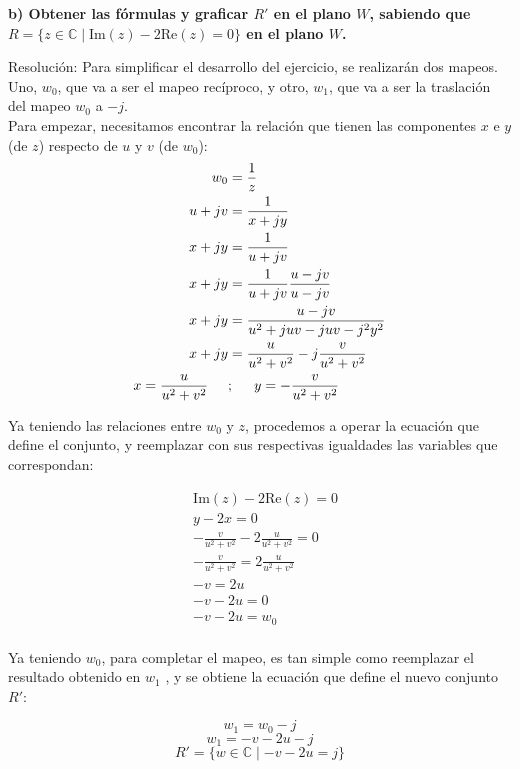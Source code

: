 \documentclass[12pt]{report}
\begin{document}
\textbf{b) Obtener las fórmulas y graficar \( R' \) en el plano \( W \), sabiendo que \( R = \{z \in \mathbb{C} \mid \text{Im}(z) - 2\text{Re}(z) = 0\} \) en el plano \( W \).}

Resolución: Para simplificar el desarrollo del ejercicio, se realizarán dos mapeos. Uno, \( w_0 \), que va a ser el mapeo recíproco, y otro, \( w_1 \), que va a ser la traslación del mapeo \( w_0 \) a \( -j \).\\

Para empezar, necesitamos encontrar la relación que tienen las componentes $x$ e $y$ (de $z$) respecto de $u$ y $v$ (de $w_0$):
\begin{align*}
    w_0 &=\frac{1}{z}\\
    u+jv &=\frac{1}{x+jy}\\
    x+jy &= \frac{1}{u+jv}\\
    x+jy &= \frac{1}{u+jv} \frac{u-jv}{u-jv}\\
    x+jy &= \frac{u-jv}{u^2+juv-juv-j^2y^2}\\
    x+jy &= \frac{u}{u^2+v^2}-j\frac{v}{u^2+v^2}\\
    x=\frac{u}{u^2+v^2} \hspace{0.5cm} &;\hspace{0.5cm} y=-\frac{v}{u^2+v^2}\\
\end{align*}


Ya teniendo las relaciones entre \( w_0 \) y \( z \), procedemos a operar la ecuación que define el conjunto, y reemplazar con sus respectivas igualdades las variables que correspondan:

\begin{align*}
&\text{Im}(z) - 2\text{Re}(z) = 0\\ 
&y - 2x = 0\\ 
&-\frac{v}{u^2 + v^2} - 2\frac{u}{u^2 + v^2} = 0\\ 
&-\frac{v}{u^2 + v^2} = 2\frac{u}{u^2 + v^2}\\ 
&-v=2u\\
&-v - 2u = 0\\ 
&-v - 2u = w_0\\ 
\end{align*}

Ya teniendo $w_0$, para completar el mapeo, es tan simple como reemplazar el resultado obtenido en $w_1$ , y se obtiene la ecuación que define el nuevo conjunto $R'$:

$$ w_1 = w_0 - j $$
$$ w_1 = -v - 2u - j $$
$$ R' = \{w \in \mathbb{C} \mid -v - 2u = j\} $$
\end{document}

